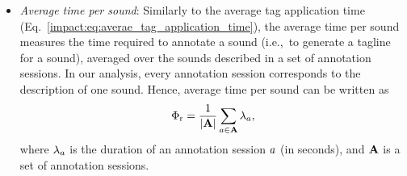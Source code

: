 \begin{itemize}
\item \textit{Average time per sound}: Similarly to the average tag application time (Eq.~\ref{impact:eq:averae_tag_application_time}), the average time per sound measures the time required to annotate a sound (i.e.,~to generate a tagline for a sound), averaged over the sounds described in a set of annotation sessions. 
In our analysis, every annotation session corresponds to the description of one sound. Hence, average time per sound can be written as
\begin{equation} \Phi_{\text{r}} =  \frac{1}{|\mathbf{A}|}\sum\limits_{a \in \mathbf{A}}{\lambda_a}, \label{ontology:eq:average_time_per_audio_clip} \end{equation}
where $\lambda_a$ is the duration of an annotation session $a$ (in seconds), and $\mathbf{A}$ is a set of annotation sessions.



\end{itemize}

